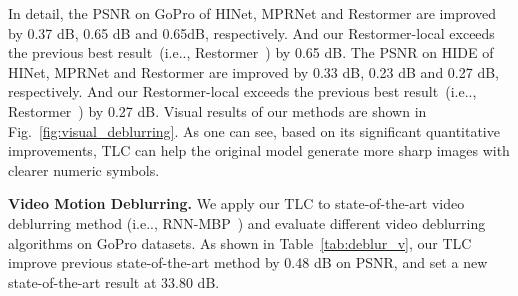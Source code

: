 \documentclass[runningheads]{llncs}
\makeatletter
\DeclareRobustCommand\onedot{\futurelet\@let@token\@onedot}
\def\@onedot{\ifx\@let@token.\else.\null\fi\xspace}
\def\ie{i.e\onedot}
\makeatother
\begin{document}
In detail, the PSNR on GoPro of HINet, MPRNet and Restormer are improved by 0.37 dB, 0.65 dB and 0.65dB, respectively. And our Restormer-local exceeds the previous best result~(\ie, Restormer~\cite{zamir2021restormer}) by 0.65 dB.
The PSNR on HIDE of HINet, MPRNet and Restormer are improved by 0.33 dB, 0.23 dB and 0.27 dB, respectively. And our Restormer-local exceeds the previous best result~(\ie, Restormer~\cite{zamir2021restormer}) by 0.27 dB. 
Visual results of our methods are shown in Fig.~\ref{fig:visual_deblurring}. As one can see, based on its significant quantitative improvements, TLC can help the original model generate more sharp images with clearer numeric symbols.


\begin{table}[t]
\caption{{Video deblurring} comparisons on the GoPro~\cite{nah2017deep} dataset}
\label{tab:deblur_v}
\end{table} \textbf{Video Motion Deblurring.} We apply our TLC to state-of-the-art video deblurring method (\ie, RNN-MBP~\cite{zhu2021deep}) and evaluate different video deblurring algorithms on GoPro datasets. As shown in Table~\ref{tab:deblur_v}, our TLC improve previous state-of-the-art method by 0.48 dB on PSNR, and set a new state-of-the-art result at 33.80 dB.
\end{document}
